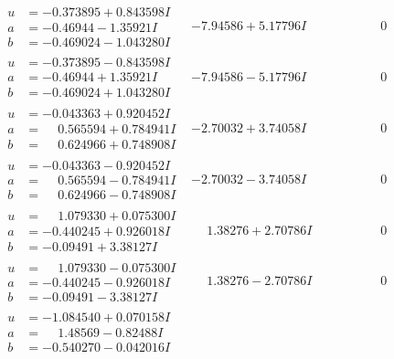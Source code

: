 \documentclass[1p]{elsarticle_modified}
\theoremstyle{definition}
\begin{document}
$$\begin{array}{c|c|c}
 \hline 
\begin{aligned}
u &= -0.373895 + 0.843598 I \\
a &= -0.46944 - 1.35921 I \\
b &= -0.469024 - 1.043280 I\end{aligned}
 & -7.94586 + 5.17796 I & \phantom{-0.000000 } 0 \\ \hline\begin{aligned}
u &= -0.373895 - 0.843598 I \\
a &= -0.46944 + 1.35921 I \\
b &= -0.469024 + 1.043280 I\end{aligned}
 & -7.94586 - 5.17796 I & \phantom{-0.000000 } 0 \\ \hline\begin{aligned}
u &= -0.043363 + 0.920452 I \\
a &= \phantom{-}0.565594 + 0.784941 I \\
b &= \phantom{-}0.624966 + 0.748908 I\end{aligned}
 & -2.70032 + 3.74058 I & \phantom{-0.000000 } 0 \\ \hline\begin{aligned}
u &= -0.043363 - 0.920452 I \\
a &= \phantom{-}0.565594 - 0.784941 I \\
b &= \phantom{-}0.624966 - 0.748908 I\end{aligned}
 & -2.70032 - 3.74058 I & \phantom{-0.000000 } 0 \\ \hline\begin{aligned}
u &= \phantom{-}1.079330 + 0.075300 I \\
a &= -0.440245 + 0.926018 I \\
b &= -0.09491 + 3.38127 I\end{aligned}
 & \phantom{-}1.38276 + 2.70786 I & \phantom{-0.000000 } 0 \\ \hline\begin{aligned}
u &= \phantom{-}1.079330 - 0.075300 I \\
a &= -0.440245 - 0.926018 I \\
b &= -0.09491 - 3.38127 I\end{aligned}
 & \phantom{-}1.38276 - 2.70786 I & \phantom{-0.000000 } 0 \\ \hline\begin{aligned}
u &= -1.084540 + 0.070158 I \\
a &= \phantom{-}1.48569 - 0.82488 I \\
b &= -0.540270 - 0.042016 I\end{aligned}

\end{array}$$
\end{document}
